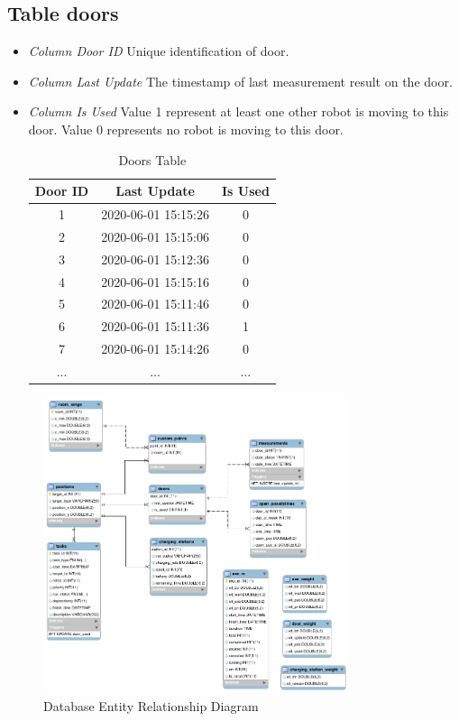 \subsection*{Table doors}
\begin{itemize}
    \item \textsl{Column Door ID} Unique identification of door.
    \item \textsl{Column Last Update} The timestamp of last measurement result on the door.
    \item \textsl{Column Is Used} Value 1 represent at least one other robot is moving to this door. Value 0 represents no robot is moving to this door.
    \begin{table}[htb]
    \centering
    \begin{tabular}{|c|c|c|} 
    \hline
    Door ID & Last Update & Is Used \\ \hline
    1 & 2020-06-01 15:15:26 & 0 \\ \hline
    2 & 2020-06-01 15:15:06 & 0 \\ \hline
    3 & 2020-06-01 15:12:36 & 0 \\ \hline
    4 & 2020-06-01 15:15:16 & 0 \\ \hline
    5 & 2020-06-01 15:11:46 & 0 \\ \hline
    6 & 2020-06-01 15:11:36 & 1 \\ \hline
    7 & 2020-06-01 15:14:26 & 0 \\ \hline
    ...& ...& ... \\ \hline
    \end{tabular}
    \caption{Doors Table}
    \label{tab:db_doors}
    \end{table}
\end{itemize}


\begin{figure}[htbp]
    \centering
    \includegraphics[width = 0.8\textwidth]{content/images/ch4/database_er.png}
    \caption{Database Entity Relationship Diagram}
    \label{fig:database_er}
    \end{figure}    

